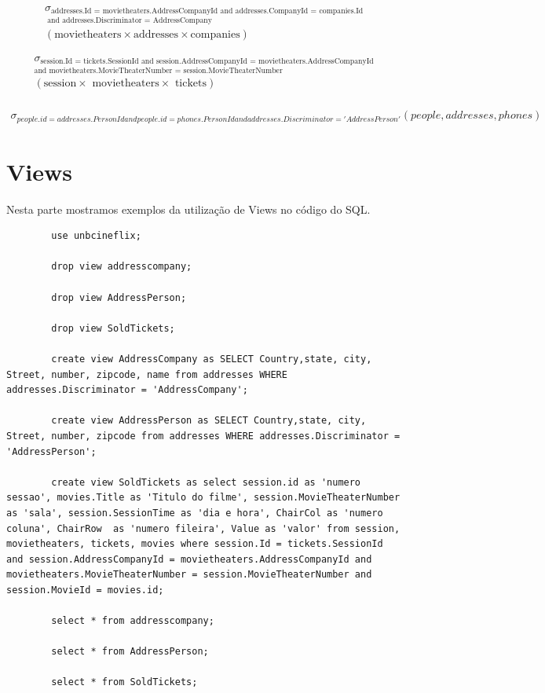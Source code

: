 \documentclass[a4paper,10pt]{article}
\begin{document}
\begin{eqnarray*}
\sigma_{\textrm{addresses.Id = movietheaters.AddressCompanyId and addresses.CompanyId = companies.Id}}\\
_{\textrm{ and addresses.Discriminator = AddressCompany}}\\
(\textrm{movietheaters} \times \textrm{addresses} \times \textrm{companies})
\end{eqnarray*}

\begin{eqnarray*}
\sigma_{\textrm{session.Id = tickets.SessionId and session.AddressCompanyId = movietheaters.AddressCompanyId}}\\
_{ \textrm{and movietheaters.MovieTheaterNumber = session.MovieTheaterNumber}}\\
(\textrm{session} \times \textrm{ movietheaters} \times \textrm{ tickets})\\
\end{eqnarray*}

\begin{eqnarray}
\sigma_{people.id = addresses.PersonId and people.id = phones.PersonId and addresses.Discriminator = 'AddressPerson'}(people, addresses,phones)
\end{eqnarray}

\section{Views}

Nesta parte mostramos exemplos da utilização de Views no código do SQL.

\begin{lstlisting}
		use unbcineflix;

		drop view addresscompany;

		drop view AddressPerson;

		drop view SoldTickets;

		create view AddressCompany as SELECT Country,state, city, Street, number, zipcode, name from addresses WHERE addresses.Discriminator = 'AddressCompany';

		create view AddressPerson as SELECT Country,state, city, Street, number, zipcode from addresses WHERE addresses.Discriminator = 'AddressPerson';

		create view SoldTickets as select session.id as 'numero sessao', movies.Title as 'Titulo do filme', session.MovieTheaterNumber as 'sala', session.SessionTime as 'dia e hora', ChairCol as 'numero coluna', ChairRow  as 'numero fileira', Value as 'valor' from session, movietheaters, tickets, movies where session.Id = tickets.SessionId and session.AddressCompanyId = movietheaters.AddressCompanyId and movietheaters.MovieTheaterNumber = session.MovieTheaterNumber and session.MovieId = movies.id;

		select * from addresscompany;

		select * from AddressPerson;

		select * from SoldTickets;
\end{lstlisting}
\end{document}
